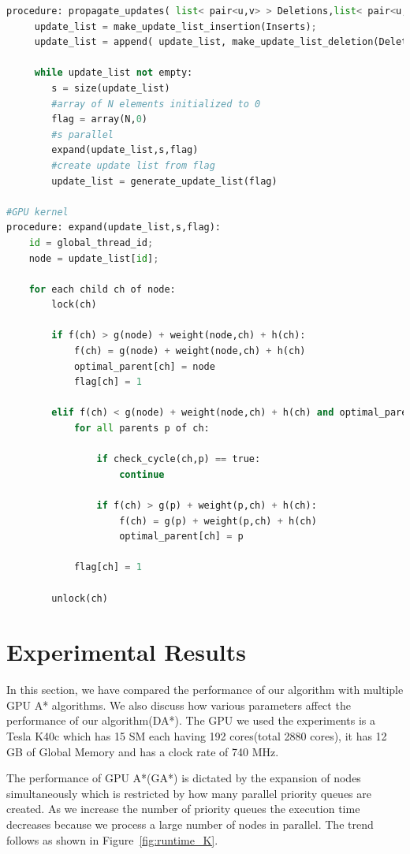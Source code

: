\documentclass[a4paper]{article}
\begin{document}
\begin{lstlisting}[language=python, caption=Propagation of Updates]
procedure: propagate_updates( list< pair<u,v> > Deletions,list< pair<u,v> > Inserts, E, N):
     update_list = make_update_list_insertion(Inserts);
     update_list = append( update_list, make_update_list_deletion(Deletions) )
     
     while update_list not empty:
        s = size(update_list)
        #array of N elements initialized to 0
        flag = array(N,0)
        #s parallel
        expand(update_list,s,flag)
        #create update list from flag
        update_list = generate_update_list(flag)

#GPU kernel
procedure: expand(update_list,s,flag):
    id = global_thread_id;
    node = update_list[id];
    
    for each child ch of node:
        lock(ch)
        
        if f(ch) > g(node) + weight(node,ch) + h(ch):
            f(ch) = g(node) + weight(node,ch) + h(ch)  
            optimal_parent[ch] = node
            flag[ch] = 1
        
        elif f(ch) < g(node) + weight(node,ch) + h(ch) and optimal_parent[ch] == node:
            for all parents p of ch:
             
                if check_cycle(ch,p) == true:
                    continue
             
                if f(ch) > g(p) + weight(p,ch) + h(ch):
                    f(ch) = g(p) + weight(p,ch) + h(ch)
                    optimal_parent[ch] = p
            
            flag[ch] = 1
        
        unlock(ch)
\end{lstlisting}


\section{Experimental Results}\label{sec:experiments}
In this section, we have compared the performance of our algorithm with multiple GPU A* algorithms. We also discuss how various parameters affect the performance of our algorithm(DA*). The GPU we used the experiments is a Tesla K40c which has 15 SM each having 192 cores(total 2880 cores), it has 12 GB of Global Memory and has a clock rate of 740 MHz.

The performance of GPU A*(GA*)\cite{GA*} is dictated by the expansion of nodes simultaneously which is restricted by how many parallel priority queues are created. As we increase the number of priority queues the execution time decreases because we process a large number of nodes in parallel. The trend follows as shown in Figure~\ref{fig:runtime_K}.
\end{document}
